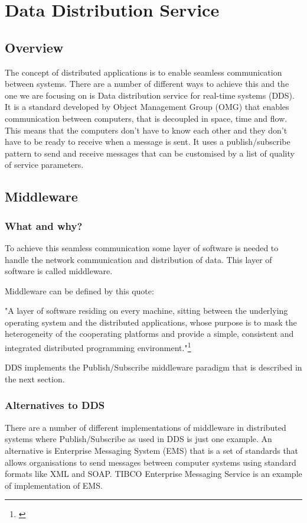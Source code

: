 \chapter{Data Distribution Service}
\section{Overview}
The concept of distributed applications is to enable seamless communication between systems. There are a number of different ways to achieve this and the one we are focusing on is Data distribution service for real-time systems (DDS).
It is a standard developed by Object Management Group (OMG) that enables communication between computers, that is decoupled in space, time and flow. This means that the computers don't have to know each other and they don't have to be ready to receive when a message is sent. It uses a publish/subscribe pattern to send and receive messages that can be customised by a list of quality of service parameters.

\section{Middleware}

\subsection{What and why?}
To achieve this seamless communication some layer of software is needed to handle the network communication and distribution of data. This layer of software is called middleware.

Middleware can be defined by this quote:

"A layer of software residing on every machine, sitting between the
underlying operating system and the distributed applications,
whose purpose is to mask the heterogeneity of the cooperating
platforms and provide a simple, consistent and integrated
distributed programming environment."\footnote{\citep{DistributedSystems}}

DDS implements the Publish/Subscribe middleware paradigm that is described in the next section.

\subsection{Alternatives to DDS}

There are a number of different implementations of middleware in distributed systems where Publish/Subscribe as used in DDS is just one example. An alternative is Enterprise Messaging System (EMS) that is a set of standards that allows organisations to send messages between computer systems using standard formats like XML and SOAP.
TIBCO Enterprise Messaging Service is an example of implementation of EMS.


